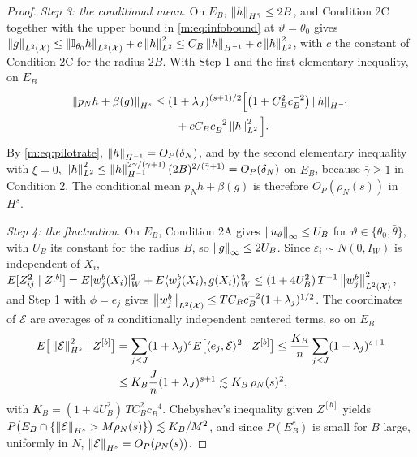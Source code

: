 \begin{proof}
\emph{Step 3: the conditional mean.} On $E_B$, $\left\|h\right\|_{H^{\bar\gamma}}\le2B$, and Condition 2C together with the upper bound in \eqref{m:eq:infobound} at $\vartheta=\theta_0$ gives $\left\|g\right\|_{L^2(\mathcal X)}\le\left\|\mathbb{I}_{\theta_0}h\right\|_{L^2(\mathcal X)}+c\left\|h\right\|^2_{L^2}\le C_B\left\|h\right\|_{H^{-1}}+c\left\|h\right\|^2_{L^2}$, with $c$ the constant of Condition 2C for the radius $2B$. With Step 1 and the first elementary inequality, on $E_B$
\[
\begin{aligned}
\left\|p_Nh+\beta(g)\right\|_{H^s}&\le(1+\lambda_J)^{(s+1)/2}\Big[\big(1+C_B^2c_B^{-2}\big)\left\|h\right\|_{H^{-1}}\\
&\qquad+cC_Bc_B^{-2}\left\|h\right\|^2_{L^2}\Big].
\end{aligned}
\]
By \eqref{m:eq:pilotrate}, $\left\|h\right\|_{H^{-1}}=O_P(\delta_N)$, and by the second elementary inequality with $\xi=0$, $\left\|h\right\|^2_{L^2}\le\left\|h\right\|^{2\bar\gamma/(\bar\gamma+1)}_{H^{-1}}(2B)^{2/(\bar\gamma+1)}=O_P(\delta_N)$ on $E_B$, because $\bar\gamma\ge1$ in Condition 2. The conditional mean $p_Nh+\beta(g)$ is therefore $O_P(\rho_N(s))$ in $H^s$.

\emph{Step 4: the fluctuation.} On $E_B$, Condition 2A gives $\left\|u_\vartheta\right\|_\infty\le U_B$ for $\vartheta\in\{\theta_0,\bar\theta\}$, with $U_B$ its constant for the radius $B$, so $\left\|g\right\|_\infty\le2U_B$. Since $\varepsilon_i\sim N(0,I_W)$ is independent of $X_i$, $E[Z_{ij}^2\mid Z^{[b]}]=E|w^b_j(X_i)|^2_W+E\langle w^b_j(X_i),g(X_i)\rangle^2_W\le(1+4U_B^2)\,T^{-1}\left\|w^b_j\right\|^2_{L^2(\mathcal X)}$, and Step 1 with $\phi=e_j$ gives $\left\|w^b_j\right\|_{L^2(\mathcal X)}\le TC_Bc_B^{-2}(1+\lambda_j)^{1/2}$. The coordinates of $\mathcal E$ are averages of $n$ conditionally independent centered terms, so on $E_B$
\[
\begin{aligned}
E\big[\left\|\mathcal E\right\|^2_{H^s}\mid Z^{[b]}\big]&=\sum_{j\le J}(1+\lambda_j)^sE\big[\langle e_j,\mathcal E\rangle^2\mid Z^{[b]}\big]\le\frac{K_B}n\sum_{j\le J}(1+\lambda_j)^{s+1}\\
&\le K_B\frac Jn(1+\lambda_J)^{s+1}\lesssim K_B\,\rho_N(s)^2,
\end{aligned}
\]
with $K_B=(1+4U_B^2)\,TC_B^2c_B^{-4}$. Chebyshev's inequality given $Z^{[b]}$ yields $P\big(E_B\cap\{\left\|\mathcal E\right\|_{H^s}>M\rho_N(s)\}\big)\lesssim K_B/M^2$, and since $P(E_B^c)$ is small for $B$ large, uniformly in $N$, $\left\|\mathcal E\right\|_{H^s}=O_P(\rho_N(s))$.


\end{proof}
